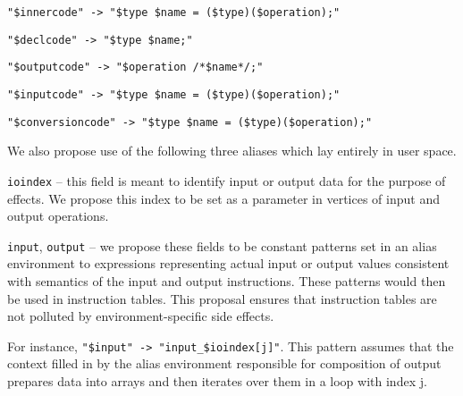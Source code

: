 \begin{description}
\item \texttt{"\$innercode" -> "\$type \$name = (\$type)(\$operation);"}
\item \texttt{"\$declcode" -> "\$type \$name;"}
\item \texttt{"\$outputcode" -> "\$operation /*\$name*/;"}
\item \texttt{"\$inputcode" -> "\$type \$name = (\$type)(\$operation);"}
\item \texttt{"\$conversioncode" -> "\$type \$name = (\$type)(\$operation);"}
\end{description}

We also propose use of the following three aliases which lay entirely in user space.

\begin{description}
  \item \texttt{ioindex} -- this field is meant to identify input or output data for the purpose of effects. We propose this index to be set as a parameter in vertices of input and output operations.
  \item \texttt{input}, \texttt{output} -- we propose these fields to be constant patterns set in an alias environment to expressions representing actual input or output values consistent with semantics of the input and output instructions. These patterns would then be used in instruction tables. This proposal ensures that instruction tables are not polluted by environment-specific side effects. 

  For instance, \texttt{"\$input" -> "input\_\$ioindex[j]"}. This pattern assumes that the context filled in by the alias environment responsible for composition of output prepares data into arrays and then iterates over them in a loop with index j. 
\end{description}


